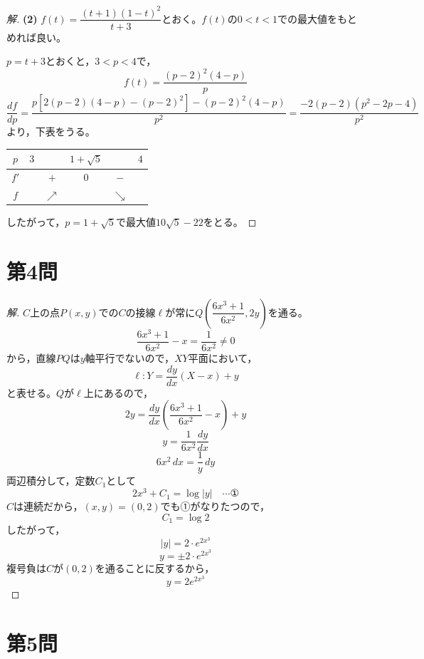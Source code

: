 \documentclass[../main.tex]{subfiles}
\begin{document}
\begin{proof}[解]
  \textbf{(2)} $f(t)=\dfrac{(t+1)(1-t)^2}{t+3}$とおく。$f(t)$の$0<t<1$での最大値をもとめれば良い。

  $p=t+3$とおくと，$3<p<4$で，
  \[
    f(t)=\frac{(p-2)^2(4-p)}{p}
  \]
  \[
    \frac{df}{dp}=\frac{p[2(p-2)(4-p)-(p-2)^2]-(p-2)^2(4-p)}{p^2}=\frac{-2(p-2)(p^2-2p-4)}{p^2}
  \]
  より，下表をうる。
  \begin{center}
    \begin{tabular}{c|ccccc}
      $p$ & $3$ & & $1+\sqrt5$ & & $4$ \\
      \hline
      $f'$ & & $+$ & $0$ & $-$ & \\
      \hline
      $f$ & & $\nearrow$ & & $\searrow$ &
    \end{tabular}
  \end{center}
  したがって，$p=1+\sqrt5$で最大値$10\sqrt5-22$をとる。
\end{proof}

\newpage

\section*{第4問}

\begin{proof}[解]
  $C$上の点$P(x,y)$での$C$の接線$\ell$が常に$Q\left(\dfrac{6x^3+1}{6x^2},2y\right)$を通る。
  \[
    \frac{6x^3+1}{6x^2}-x=\frac{1}{6x^2}\ne0
  \]
  から，直線$PQ$は$y$軸平行でないので，$XY$平面において，
  \[
    \ell: Y=\frac{dy}{dx}(X-x)+y
  \]
  と表せる。$Q$が$\ell$上にあるので，
  \[
    2y=\frac{dy}{dx}\left(\frac{6x^3+1}{6x^2}-x\right)+y
  \]
  \[
    y=\frac{1}{6x^2}\frac{dy}{dx}
  \]
  \[
    6x^2\,dx=\frac1y\,dy
  \]
  両辺積分して，定数$C_1$として
  \[
    2x^3+C_1=\log|y| \quad\cdots\text{①}
  \]
  $C$は連続だから，$(x,y)=(0,2)$でも①がなりたつので，
  \[
    C_1=\log2
  \]
  したがって，
  \[
    |y|=2\cdot e^{2x^3}
  \]
  \[
    y=\pm2\cdot e^{2x^3}
  \]
  複号負は$C$が$(0,2)$を通ることに反するから，
  \[
    y=2e^{2x^3}
  \]
\end{proof}

\newpage

\section*{第5問}
\end{document}
